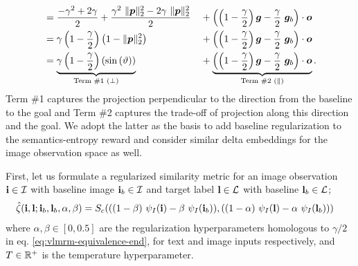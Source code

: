 \begin{align}
    &= \dfrac{-\gamma^2 + 2\gamma}{2} + \dfrac{\gamma^2\ \norm{\bmp}^2_2 - 2 \gamma\ \norm{\bmp}^2_2}{2} &&+ \left(\left(1 - \dfrac{\gamma}{2}\right) \bmg - \dfrac{\gamma}{2}\ \bmg_b\right) \cdot \bmo\\ %
    &= \gamma\left(1 - \dfrac{\gamma}{2}\right)\left(1 -\norm{\bmp}^2_2\right) &&+ \left(\left(1 - \dfrac{\gamma}{2}\right) \bmg - \dfrac{\gamma}{2}\ \bmg_b\right) \cdot \bmo\\
    &= \underbrace{\gamma\left(1 - \dfrac{\gamma}{2}\right)\left(\sin\left(\vartheta\right)\right)}_{\text{Term \#1 (\(\perp\))}} &&+ \underbrace{\left(\left(1 - \dfrac{\gamma}{2}\right) \bmg - \dfrac{\gamma}{2}\ \bmg_b\right) \cdot \bmo}_{\text{Term \#2 (\(\parallel\))}}.
    \label{eq:vlmrm-equivalence-end}
\end{align}
Term \#1 captures the projection perpendicular to the direction from the baseline to the goal and Term \#2 captures the trade-off of projection along this direction and the goal. We adopt the latter as the basis to add baseline regularization to the semantics-entropy reward and consider similar delta embeddings for the image observation space as well.

First, let us formulate a regularized similarity metric for an image observation \(\mathbf{i} \in \mathcal{I}\) with baseline image \(\mathbf{i}_b \in \mathcal{I}\) and target label \(\mathbf{l} \in \mathcal{L}\) with baseline \(\mathbf{l}_b \in \mathcal{L}\);
\begin{equation}
    \label{eq:clip-similarity-reg}
    \begin{split}
        \hat{\zeta}(\mathbf{i}, \mathbf{l}; \mathbf{i}_b, \mathbf{l}_b, \alpha, \beta)
        &= S_c(
            ((1 - \beta)\ \psi_I(\mathbf{i}) - \beta\ \psi_I(\mathbf{i}_b)),
            ((1 - \alpha)\ \psi_I(\mathbf{l}) - \alpha\ \psi_I(\mathbf{l}_b))
        )
    \end{split}
\end{equation}
where \(\alpha, \beta \in [0, 0.5]\) are the regularization hyperparameters homologous to \(\gamma / 2\) in eq. \eqref{eq:vlmrm-equivalence-end}, for text and image inputs respectively, and \(T \in \mathbb{R}^+\) is the temperature hyperparameter.


